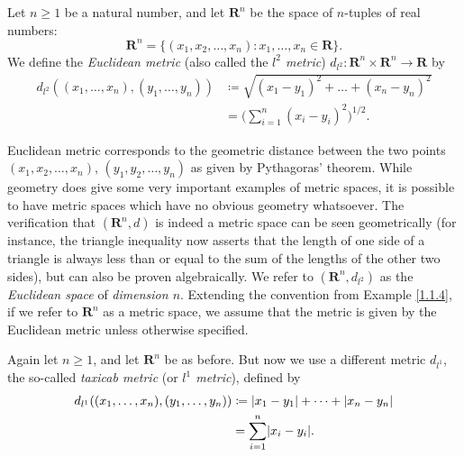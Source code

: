 \begin{example}\label{1.1.6}
    Let \(n \geq 1\) be a natural number, and let \(\mathbf{R}^n\) be the space of \(n\)-tuples of real numbers:
    \[
        \mathbf{R}^n = \{(x_1, x_2, \dots, x_n) : x_1, \dots, x_n \in \mathbf{R}\}.
    \]
    We define the \emph{Euclidean metric} (also called the \emph{\(l^2\) metric}) \(d_{l^2} : \mathbf{R}^n \times\mathbf{R}^n \to \mathbf{R}\) by
    \begin{align*}
        d_{l^2}((x_1, \dots, x_n), (y_1, \dots, y_n)) & \coloneqq \sqrt{(x_1 - y_1)^2 + \dots + (x_n - y_n)^2} \\
                                                      & = \bigg(\sum_{i = 1}^n (x_i - y_i)^2\bigg)^{1 / 2}.
    \end{align*}
\end{example}

\begin{note}
    Euclidean metric corresponds to the geometric distance between the two points \((x_1, x_2, \dots, x_n)\), \((y_1, y_2, \dots, y_n)\) as given by Pythagoras' theorem.
    While geometry does give some very important examples of metric spaces, it is possible to have metric spaces which have no obvious geometry whatsoever.
    The verification that \((\mathbf{R}^n, d)\) is indeed a metric space can be seen geometrically (for instance, the triangle inequality now asserts that the length of one side of a triangle is always less than or equal to the sum of the lengths of the other two sides), but can also be proven algebraically.
    We refer to \((\mathbf{R}^n , d_{l^2})\) as the \emph{Euclidean space} of \emph{dimension \(n\)}.
    Extending the convention from Example \ref{1.1.4}, if we refer to \(\mathbf{R}^n\) as a metric space, we assume that the metric is given by the Euclidean metric unless otherwise specified.
\end{note}

\begin{example}\label{1.1.7}
    Again let \(n \geq 1\), and let \(\mathbf{R}^n\) be as before.
    But now we use a different metric \(d_{l^1}\), the so-called \emph{taxicab metric} (or \emph{\(l^1\) metric}), defined by
    \begin{align*}
        d_{l^1}((x_1, \dots, x_n), (y_1, \dots, y_n)) & \coloneqq \abs*{x_1 - y_1} + \dots + \abs*{x_n - y_n} \\
                                                      & = \sum_{i = 1}^n \abs*{x_i - y_i}.
    \end{align*}
\end{example}

